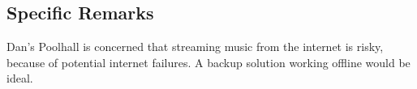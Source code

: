 \subsection{Specific Remarks}
\label{sub:specific_remarks}

Dan's Poolhall is concerned that streaming music from the internet is risky, because of potential internet failures. A backup solution working offline would be ideal.











